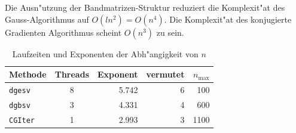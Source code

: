 Die Ausn"utzung der Bandmatrizen-Struktur reduziert die Komplexit"at des
Gauss-Algorithmus auf $O(ln^2)=O(n^4)$. Die Komplexit"at des konjugierte
Gradienten Algorithmus scheint $O(n^3)$ zu sein.
\begin{table}
\begin{center}
\begin{tabular}{|l|crrr|}
\hline
Methode&Threads&Exponent&vermutet&$n_{\text{max}}$\\
\hline
{\tt dgesv}&8&5.742&6&100\\
{\tt dgbsv}&3&4.331&4&600\\
{\tt CGIter}&1& 2.993&3&1100\\
\hline
\end{tabular}
\end{center}
\caption{Laufzeiten und Exponenten der Abh"angigkeit von $n$\label{results}}
\end{table}
